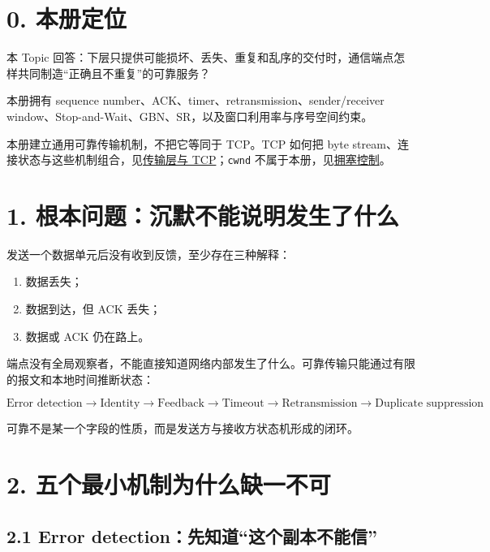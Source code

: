 \documentclass[UTF8,fontset=none,11pt,a4paper]{ctexart}
\providecommand{\tightlist}{\setlength{\itemsep}{0pt}\setlength{\parskip}{0pt}}
\providecommand{\passthrough}[1]{#1}
\begin{document}
\section{0. 本册定位}\label{0-ux672cux518cux5b9aux4f4d}

本 Topic
回答：下层只提供可能损坏、丢失、重复和乱序的交付时，通信端点怎样共同制造``正确且不重复''的可靠服务？

本册拥有 sequence number、ACK、timer、retransmission、sender/receiver
window、Stop-and-Wait、GBN、SR，以及窗口利用率与序号空间约束。

本册建立通用可靠传输机制，不把它等同于 TCP。TCP 如何把 byte
stream、连接状态与这些机制组合，见\href{../06_传输层_端点_UDP与TCP状态机/README.md}{传输层与
TCP}；\passthrough{\lstinline!cwnd!}
不属于本册，见\href{../07_拥塞_共享资源与反馈控制/README.md}{拥塞控制}。

\section{1.
根本问题：沉默不能说明发生了什么}\label{1-ux6839ux672cux95eeux9898ux6c89ux9ed8ux4e0dux80fdux8bf4ux660eux53d1ux751fux4e86ux4ec0ux4e48}

发送一个数据单元后没有收到反馈，至少存在三种解释：

\begin{enumerate}
\def\labelenumi{\arabic{enumi}.}
\tightlist
\item
  数据丢失；
\item
  数据到达，但 ACK 丢失；
\item
  数据或 ACK 仍在路上。
\end{enumerate}

端点没有全局观察者，不能直接知道网络内部发生了什么。可靠传输只能通过有限的报文和本地时间推断状态：

\[
\boxed{
\text{Error detection}
\to \text{Identity}
\to \text{Feedback}
\to \text{Timeout}
\to \text{Retransmission}
\to \text{Duplicate suppression}
}
\]

可靠不是某一个字段的性质，而是发送方与接收方状态机形成的闭环。

\section{2.
五个最小机制为什么缺一不可}\label{2-ux4e94ux4e2aux6700ux5c0fux673aux5236ux4e3aux4ec0ux4e48ux7f3aux4e00ux4e0dux53ef}

\subsection{2.1 Error
detection：先知道``这个副本不能信''}\label{21-error-detectionux5148ux77e5ux9053ux8fd9ux4e2aux526fux672cux4e0dux80fdux4fe1}
\end{document}
